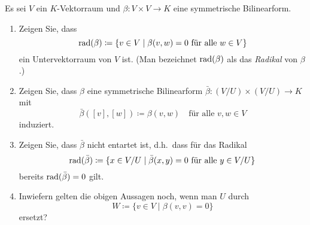 \documentclass[a4paper,10pt]{scrartcl}
\begin{document}
\begin{question}
  Es sei $V$ ein $K$-Vektorraum und $\beta \colon V \times V \to K$ eine symmetrische Bilinearform.
  \begin{enumerate}[leftmargin=*]
    \item
      Zeigen Sie, dass
      \[
        \operatorname{rad}(\beta) \coloneqq \{ v \in V \mid \text{$\beta(v, w) = 0$ für alle $w \in V$} \}
      \]
      ein Untervektorraum von $V$ ist.
      (Man bezeichnet $\operatorname{rad}(\beta)$ als das \emph{Radikal} von $\beta$.)
    \item
      Zeigen Sie, dass $\beta$ eine symmetrische Bilinearform $\bar{\beta} \colon (V/U) \times (V/U) \to K$ mit
      \[
        \bar{\beta}([v], [w])
        \coloneqq
        \beta(v,w)
        \quad
        \text{für alle $v, w \in V$}
      \]
      induziert.
    \item
      Zeigen Sie, dass $\bar{\beta}$ nicht entartet ist, d.h.\ dass für das Radikal
      \[
                  \operatorname{rad}(\bar{\beta})
        \coloneqq \{ x \in V/U \mid \text{$\bar{\beta}(x,y) = 0$ für alle $y \in V/U$} \}
      \]
      bereits $\operatorname{rad}(\bar{\beta}) = 0$ gilt.
    \item
      Inwiefern gelten die obigen Aussagen noch, wenn man $U$ durch
      \[
        W \coloneqq \{v \in V \mid \beta(v,v) = 0\}
      \]
      ersetzt?
  \end{enumerate}
\end{question}
\end{document}
